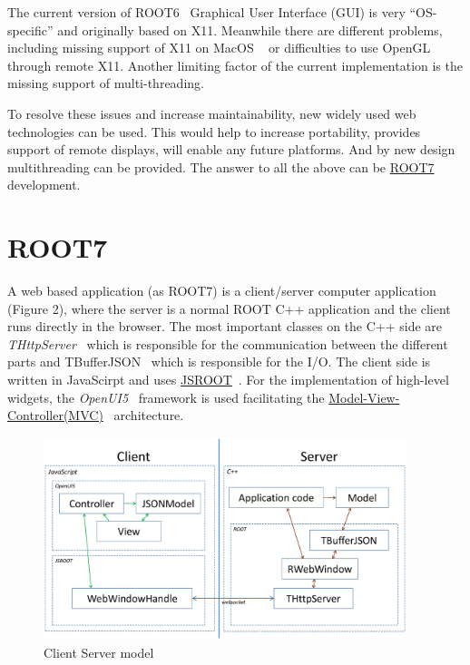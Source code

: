 \documentclass[a4paper]{jpconf}
\begin{document}
The current version of ROOT6~\cite{root6} Graphical User Interface (GUI) is very ``OS-specific'' and originally based on X11.
Meanwhile there are different problems, including missing support of X11 on MacOS ~\cite{x11} or difficulties to use OpenGL through remote X11.
Another limiting factor of the current implementation is the missing support of multi-threading.

To resolve these issues and increase maintainability, new widely used web technologies can be used. This would help to increase portability,
provides support of remote displays, will enable any future platforms. And by new design multithreading can be provided.
The answer to all the above can be \href{https://root.cern.ch/root-7}{ROOT7}~\cite{root7} development.

\section{ROOT7}

A web based application (as ROOT7) is a client/server computer application (Figure 2),
where the server is a normal ROOT C++ application and the client runs directly in the browser.
The most important classes on the C++ side are {\it THttpServer}~\cite{http} which is responsible
for the communication between the different parts and TBufferJSON~\cite{buffer}
which is responsible for the I/O. The client side is written in JavaScirpt and uses \href{https://root.cern/js/}{JSROOT}~\cite{jsroot}.
For the implementation of high-level widgets, the \textit{OpenUI5}~\cite{openui} framework is used facilitating the
\href{https://en.wikipedia.org/wiki/Model%E2%80%93view%E2%80%93controller}{Model-View-Controller(MVC)}~\cite{mvc}
architecture.

\begin{figure}[h]
  \begin{center}
    \includegraphics[width=25pc]{figure2.eps}\hspace{2pc}%
  \end{center}
  \centering
\begin{minipage}[b]{20pc}\caption{\label{label}Client Server model}
\end{minipage}
\end{figure}
\end{document}
